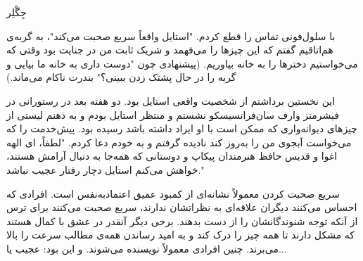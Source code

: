 جِگْلِر

با سلول‌فونی تماس را قطع کردم. "استایل واقعاً سریع صحبت می‌کند"، به گربه‌ی هم‌اتاقیم گفتم که این چیزها را می‌فهمد و شریک ثابت من در جنایت بود وقتی که می‌خواستیم دخترها را به خانه بیاوریم. (پیشنهادی چون "دوست داری به خانه ما بیایی و گربه را در حال پشتک زدن ببینی؟" بندرت ناکام می‌ماند.)

این نخستین برداشتم از شخصیت واقعی استایل بود. دو هفته بعد در رستورانی در فیشرمنز وارف سان‌فرانسیسکو نشستم و منتظر استایل بودم و به ذهنم لیستی از چیزهای دیوانه‌واری که ممکن است با او ایراد داشته باشد رسیده بود. پیش‌خدمت را که می‌خواست آبجوی من را به‌روز کند نادیده گرفتم و به خودم دعا کردم. "لطفاً، ای الهه اغوا و قدیس حافظ هنرمندان پیکاپ و دوستانی که همه‌جا به دنبال آرامش هستند، خواهش می‌کنم استایل دچار رفتار عجیب نباشد."

سریع صحبت کردن معمولاً نشانه‌ای از کمبود عمیق اعتمادبه‌نفس است. افرادی که احساس می‌کنند دیگران علاقه‌ای به نظراتشان ندارند، سریع صحبت می‌کنند برای ترس از آنکه توجه شنوندگانشان را از دست بدهند. برخی دیگر آنقدر در عشق با کمال هستند که مشکل دارند تا همه چیز را درک کند و به امید رساندن همه‌ی مطالب سرعت را بالا می‌برند. چنین افرادی معمولاً نویسنده می‌شوند. و این بود: عجیب یا...